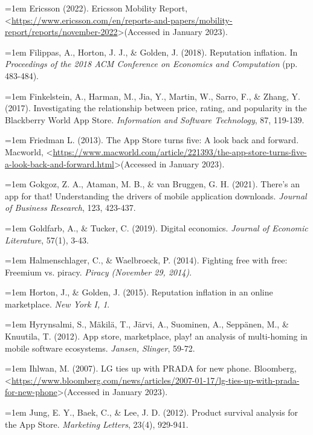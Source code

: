 \hangindent=1em
Ericsson (2022). Ericsson Mobility Report, \textless \url{https://www.ericsson.com/en/reports-and-papers/mobility-report/reports/november-2022}\textgreater (Accessed in January 2023).

\hangindent=1em
Filippas, A., Horton, J. J., \& Golden, J. (2018). Reputation inflation. In \textit{Proceedings of the 2018 ACM Conference on Economics and Computation} (pp. 483-484).

\hangindent=1em
Finkelstein, A., Harman, M., Jia, Y., Martin, W., Sarro, F., \& Zhang, Y. (2017). Investigating the relationship between price, rating, and popularity in the Blackberry World App Store. \textit{Information and Software Technology}, 87, 119-139.

\hangindent=1em
Friedman L. (2013). The App Store turns five: A look back and forward. Macworld, \textless \url{https://www.macworld.com/article/221393/the-app-store-turns-five-a-look-back-and-forward.html}\textgreater (Accessed in January 2023).

\hangindent=1em
Gokgoz, Z. A., Ataman, M. B., \& van Bruggen, G. H. (2021). There’s an app for that! Understanding the drivers of mobile application downloads. \textit{Journal of Business Research}, 123, 423-437.

\hangindent=1em
Goldfarb, A., \& Tucker, C. (2019). Digital economics. \textit{Journal of Economic Literature}, 57(1), 3-43.

\hangindent=1em
Halmenschlager, C., \& Waelbroeck, P. (2014). Fighting free with free: Freemium vs. piracy. \textit{Piracy (November 29, 2014)}.

\hangindent=1em
Horton, J., \& Golden, J. (2015). Reputation inflation in an online marketplace. \textit{New York I, 1}.

\hangindent=1em
Hyrynsalmi, S., Mäkilä, T., Järvi, A., Suominen, A., Seppänen, M., \& Knuutila, T. (2012). App store, marketplace, play! an analysis of multi-homing in mobile software ecosystems. \textit{Jansen, Slinger}, 59-72.

\hangindent=1em
Ihlwan, M. (2007). LG ties up with PRADA for new phone. Bloomberg, \textless \url{https://www.bloomberg.com/news/articles/2007-01-17/lg-ties-up-with-prada-for-new-phone}\textgreater (Accessed in January 2023).

\hangindent=1em
Jung, E. Y., Baek, C., \& Lee, J. D. (2012). Product survival analysis for the App Store. \textit{Marketing Letters}, 23(4), 929-941.


